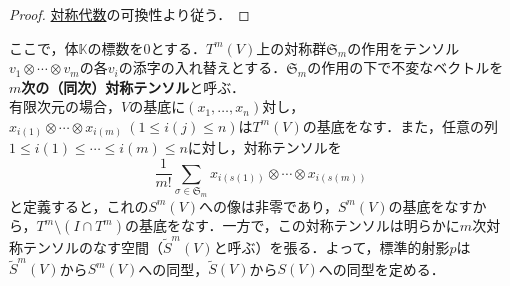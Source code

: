 \documentclass[rep_main]{subfiles}
\begin{document}
\begin{proof}
	\hyperref[def:sym-alg]{対称代数}の可換性より従う．
\end{proof}
ここで，体$\mathbb{K}$の標数を$0$とする．$T^m(V)$上の対称群$\mathfrak{S}_m$の作用をテンソル$v_1 \otimes \cdots \otimes v_m$の各$v_i$の添字の入れ替えとする．$\mathfrak{S}_m$の作用の下で不変なベクトルを\textbf{$m$次の（同次）対称テンソル}と呼ぶ．\\
有限次元の場合，$V$の基底に$(x_1, \ldots, x_n)$対し，$x_{i(1)} \otimes \cdots \otimes x_{i(m)}\ (1 \leq i(j) \leq n)$は$T^m(V)$の基底をなす．また，任意の列$1 \leq i(1) \leq \cdots \leq i(m)  \leq n$に対し，対称テンソルを
\begin{equation}
	\frac{1}{m!} \sum_{\sigma \in \mathfrak{S}_m} x_{i(s(1))} \otimes \cdots \otimes x_{i(s(m))}
\end{equation}
と定義すると，これの$S^m(V)$への像は非零であり，$S^m(V)$の基底をなすから，$T^m \setminus (I \cap T^m)$の基底をなす．一方で，この対称テンソルは明らかに$m$次対称テンソルのなす空間（$\tilde{S}^m(V)$と呼ぶ）を張る．よって，標準的射影$p$は$\tilde{S}^m(V)$から$S^m(V)$への同型，$\tilde{S}(V)$から$S(V)$への同型を定める．
\end{document}
